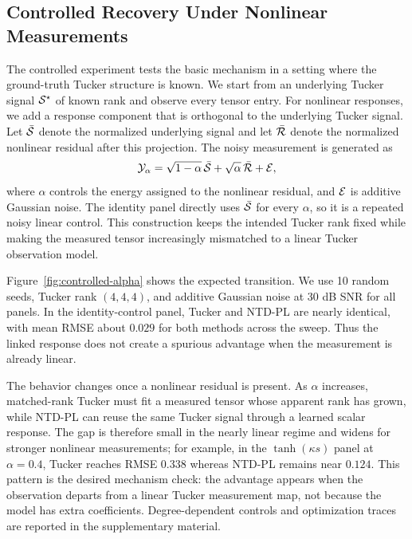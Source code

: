 \subsection{Controlled Recovery Under Nonlinear Measurements}
\label{sec:exp-controlled}

The controlled experiment tests the basic mechanism in a setting where the
ground-truth Tucker structure is known. We start from an underlying Tucker
signal \(\mathcal{S}^\star\) of known rank and observe every tensor entry. For nonlinear
responses, we add a response component that is
orthogonal to the underlying Tucker signal. Let \(\bar{\mathcal{S}}\) denote the
normalized underlying signal and let \(\bar{\mathcal{R}}\) denote the normalized
nonlinear residual after this projection. The noisy measurement is generated
as
\begin{equation}
  \mathcal{Y}_\alpha =
  \sqrt{1-\alpha}\,\bar{\mathcal{S}}
  +
  \sqrt{\alpha}\,\bar{\mathcal{R}}
  + \mathcal{E},
\end{equation}
where \(\alpha\) controls the energy assigned to the nonlinear residual, and
\(\mathcal{E}\) is additive Gaussian noise. The identity panel directly uses
\(\bar{\mathcal{S}}\) for every \(\alpha\), so it is a repeated noisy linear control. This
construction keeps the intended Tucker rank fixed while making the measured
tensor increasingly mismatched to a linear Tucker observation model.

Figure~\ref{fig:controlled-alpha} shows the expected transition. We use 10
random seeds, Tucker rank \((4,4,4)\), and additive Gaussian noise at 30 dB SNR
for all panels. In the identity-control panel, Tucker and NTD-PL are nearly
identical, with mean RMSE about \(0.029\) for both methods across the sweep.
Thus the linked response does not create a spurious advantage when the
measurement is already linear.

The behavior changes once a nonlinear residual is present. As \(\alpha\)
increases, matched-rank Tucker must fit a measured tensor whose apparent rank
has grown, while NTD-PL can reuse the same Tucker signal through a learned
scalar response. The gap is therefore small in the nearly linear regime and
widens for stronger nonlinear measurements; for example, in the
\(\tanh(\kappa s)\) panel at \(\alpha=0.4\), Tucker reaches RMSE \(0.338\)
whereas NTD-PL remains near \(0.124\). This pattern is the desired mechanism
check: the advantage appears when the observation departs from a linear Tucker
measurement map, not because the model has extra coefficients.
Degree-dependent controls and optimization traces are reported in the
supplementary material.

